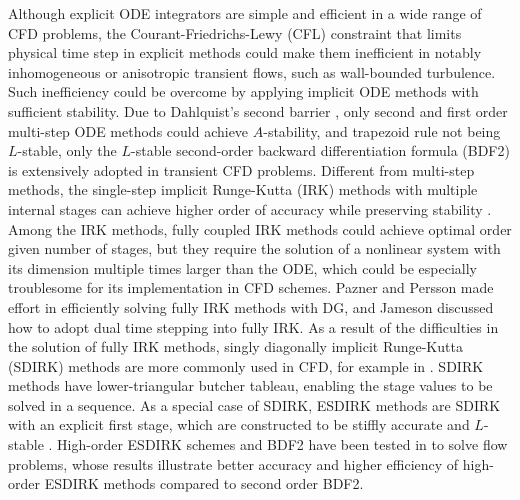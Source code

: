 \documentclass[preprint,12pt]{elsarticle}
\begin{document}
Although explicit ODE integrators
are simple and efficient in a wide range of
CFD problems,
the Courant-Friedrichs-Lewy (CFL) constraint
that limits physical time step in explicit
methods could make them inefficient in
notably inhomogeneous or anisotropic
transient flows,
such as wall-bounded turbulence.
Such inefficiency could be overcome by
applying implicit ODE methods with
sufficient stability.
Due to Dahlquist's second barrier
\cite{dahlquist1963special},
only second and first order multi-step ODE methods
could achieve $A$-stability, and
trapezoid rule not being $L$-stable,
only the $L$-stable
second-order backward differentiation formula (BDF2)
is extensively adopted in transient CFD problems.
Different from multi-step methods,
the single-step implicit Runge-Kutta (IRK) methods
with multiple internal stages
can achieve higher order of accuracy while
preserving stability \cite{butcher2016ODEBook}.
Among the IRK methods, fully coupled IRK methods
could achieve optimal order given number of stages,
but they require the solution of a nonlinear
system with its dimension multiple times larger
than the ODE, which could be especially
troublesome for its implementation in
CFD schemes.
Pazner and Persson
\cite{pazner2017stage}
made effort in efficiently solving
fully IRK methods with DG, and
Jameson \cite{jameson2017evaluation}
discussed how to adopt dual time stepping
into fully IRK.
As a result of the difficulties in the solution
of fully IRK methods,
singly diagonally implicit Runge-Kutta (SDIRK)
methods are more commonly used in CFD, for example in
\cite{wang2017compact_VR}.
SDIRK methods have lower-triangular butcher tableau,
enabling the stage values to be solved in a sequence.
As a special case of SDIRK,
ESDIRK methods are SDIRK with an explicit first stage,
which are constructed to be
stiffly accurate and $L$-stable
\cite{kennedy2003additiveARK,kvaerno2004singly}.
High-order ESDIRK schemes and
BDF2 have been tested in
\cite{
    bijl2002implicitBDFvESDIRK,
    wang2007implicitDGTests}
to solve flow problems,
whose results illustrate
better accuracy and higher efficiency
of high-order ESDIRK methods
compared to second order BDF2.
\end{document}
